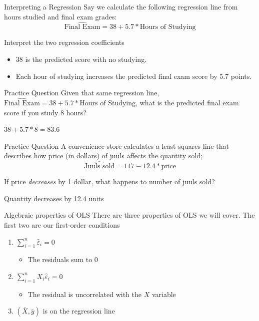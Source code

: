 \documentclass[aspectratio=169,t,11pt,table]{beamer}
\begin{document}
\begin{frame}{Interpreting a Regression}
  Say we calculate the following regression line from hours studied and final exam grades:
  $$
    \widehat{\text{Final Exam}} = 38 + 5.7 * \text{Hours of Studying}
  $$

  Interpret the two regression coefficients
  \pause

  \begin{itemize}
    \item 38 is the predicted score with no studying.
    \pause
    \item Each hour of studying increases the predicted final exam score by 5.7 points.
  \end{itemize}
\end{frame}

\begin{frame}{Practice Question}
  Given that same regression line, $\widehat{\text{Final Exam}} = 38 + 5.7 * \text{Hours of Studying}$, what is the predicted final exam score if you study 8 hours?

  \pause 
  $38 + 5.7 * 8 = 83.6$
\end{frame}

\begin{frame}{Practice Question}
  A convenience store calculates a least squares line that describes how price (in dollars) of juuls affects the quantity sold; 
  $$
    \widehat{\text{Juuls sold}} = 117 - 12.4 * \text{price}
  $$ 

  If price \emph{decreases} by 1 dollar, what happens to number of juuls sold?

  \pause
  Quantity decreases by 12.4 units
\end{frame}



\begin{frame}{Algebraic properties of OLS}
  There are three properties of OLS we will cover. The first two are our first-order conditions
  \begin{enumerate}
    \item $\sum_{i=1}^n \hat{\varepsilon}_i = 0$
    \begin{itemize}
      \item The residuals sum to $0$
    \end{itemize}

    \pause
    \medskip
    \item $\sum_{i=1}^n X_i \hat{\varepsilon}_i = 0$
    \begin{itemize}
      \item The residual is uncorrelated with the $X$ variable
    \end{itemize}
    
    \pause
    \medskip
    \item $(\bar{X}, \bar{y})$ is on the regression line
  \end{enumerate}
\end{frame}
\end{document}
